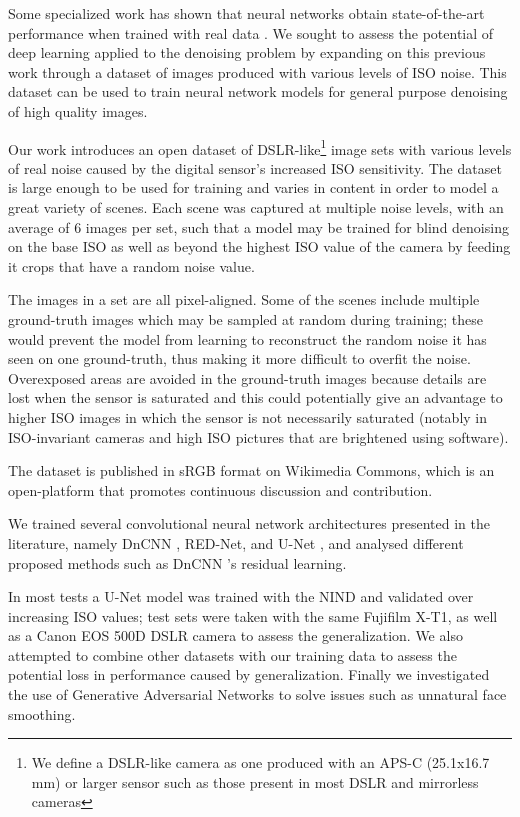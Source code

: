 Some specialized work has shown that neural networks obtain state-of-the-art performance when trained with real data \cite{learningtoseeinthedark}\cite{microscopynoise}. We sought to assess the potential of deep learning applied to the denoising problem by expanding on this previous work through a dataset of images produced with various levels of ISO noise. This dataset can be used to train neural network models for general purpose denoising of high quality images.

Our work introduces an open dataset of DSLR-like\footnote{\label{largesensornote}We define a DSLR-like camera as one produced with an APS-C (25.1x16.7 mm) or larger sensor such as those present in most DSLR and mirrorless cameras} image sets with various levels of real noise caused by the digital sensor's increased ISO sensitivity. The dataset is large enough to be used for training and varies in content in order to model a great variety of scenes. Each scene was captured at multiple noise levels, with an average of 6 images per set, such that a model may be trained for blind denoising on the base ISO as well as beyond the highest ISO value of the camera by feeding it crops that have a random noise value.

The images in a set are all pixel-aligned. Some of the scenes include multiple ground-truth images which may be sampled at random during training; these would prevent the model from learning to reconstruct the random noise it has seen on one ground-truth, thus making it more difficult to overfit the noise. Overexposed areas are avoided in the ground-truth images because details are lost when the sensor is saturated and this could potentially give an advantage to higher ISO images in which the sensor is not necessarily saturated (notably in ISO-invariant cameras and high ISO pictures that are brightened using software).

The dataset is published in sRGB format on Wikimedia Commons, which is an open-platform that promotes continuous discussion and contribution.

We trained several convolutional neural network architectures presented in the literature, namely DnCNN \cite{dncnn}, \ac{RED-Net}, and U-Net \cite{unet}, and analysed different proposed methods such as DnCNN \cite{dncnn}'s residual learning. 

In most tests a U-Net model was trained with the \ac{NIND} and validated over increasing ISO values; test sets were taken with the same Fujifilm X-T1, as well as a Canon EOS 500D DSLR camera to assess the generalization. We also attempted to combine other datasets with our training data to assess the potential loss in performance caused by generalization. %
Finally we investigated the use of Generative Adversarial Networks\cite{pix2pix} to solve issues such as unnatural face smoothing.

